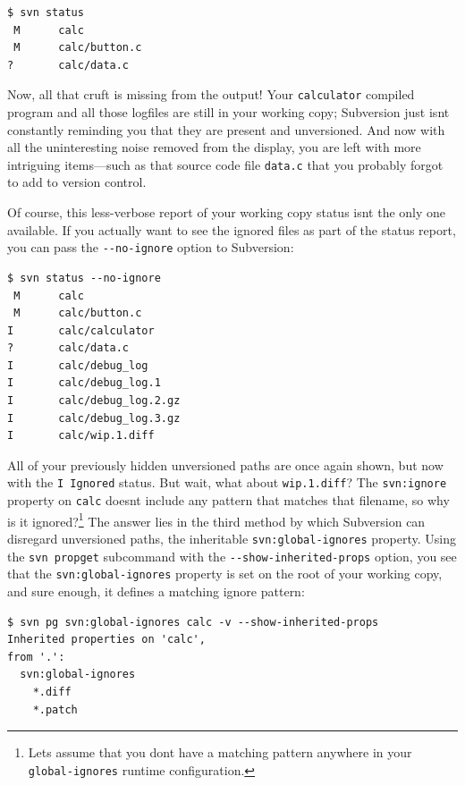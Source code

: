 \begin{verbatim}
$ svn status
 M      calc
 M      calc/button.c
?       calc/data.c
\end{verbatim}

Now, all that cruft is missing from the output! Your \texttt{calculator}
compiled program and all those logfiles are still in your working copy;
Subversion just isn\textquotesingle t constantly reminding you that they
are present and unversioned. And now with all the uninteresting noise
removed from the display, you are left with more intriguing items---such
as that source code file \texttt{data.c} that you probably forgot to add
to version control.

Of course, this less-verbose report of your working copy status
isn\textquotesingle t the only one available. If you actually want to
see the ignored files as part of the status report, you can pass the
\texttt{-\/-no-ignore} option to Subversion:

\begin{verbatim}
$ svn status --no-ignore
 M      calc
 M      calc/button.c
I       calc/calculator
?       calc/data.c
I       calc/debug_log
I       calc/debug_log.1
I       calc/debug_log.2.gz
I       calc/debug_log.3.gz
I       calc/wip.1.diff
\end{verbatim}

All of your previously hidden unversioned paths are once again shown,
but now with the \texttt{\textquotesingle{}I\textquotesingle{}\ Ignored}
status. But wait, what about \texttt{wip.1.diff}? The
\texttt{svn:ignore} property on \texttt{calc} doesn\textquotesingle t
include any pattern that matches that filename, so why is it
ignored?\footnote{Let\textquotesingle s assume that you
  don\textquotesingle t have a matching pattern anywhere in your
  \texttt{global-ignores} runtime configuration.} The answer lies in the
third method by which Subversion can disregard unversioned paths, the
inheritable \texttt{svn:global-ignores} property. Using the
\texttt{svn\ propget} subcommand with the
\texttt{-\/-show-inherited-props} option, you see that the
\texttt{svn:global-ignores} property is set on the root of your working
copy, and sure enough, it defines a matching ignore pattern:

\begin{verbatim}
$ svn pg svn:global-ignores calc -v --show-inherited-props
Inherited properties on 'calc',
from '.':
  svn:global-ignores
    *.diff
    *.patch
\end{verbatim}

